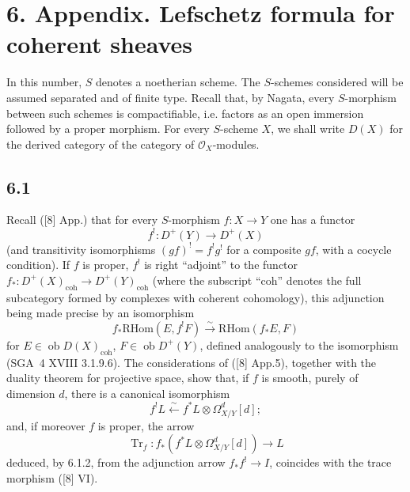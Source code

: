 \documentclass[11pt]{article}
\providecommand{\cO}{\mathcal{O}}
\providecommand{\RHom}{\mathrm{RHom}}
\begin{document}
\section*{6. Appendix. Lefschetz formula for coherent sheaves}

In this number, $S$ denotes a noetherian scheme. The $S$-schemes considered will be assumed separated and of finite type. Recall that, by Nagata, every $S$-morphism between such schemes is compactifiable, i.e. factors as an open immersion followed by a proper morphism. For every $S$-scheme $X$, we shall write $D(X)$ for the derived category of the category of $\cO_X$-modules.

\subsection*{6.1}
Recall ([8] App.) that for every $S$-morphism $f:X\to Y$ one has a functor
\[
f^!:D^+(Y)\longrightarrow D^+(X)
\]
(and transitivity isomorphisms $(gf)^! = f^!g^!$ for a composite $gf$, with a cocycle condition). If $f$ is proper, $f^!$ is right ``adjoint'' to the functor $f_*:D^+(X)_{\mathrm{coh}}\to D^+(Y)_{\mathrm{coh}}$ (where the subscript ``coh'' denotes the full subcategory formed by complexes with coherent cohomology), this adjunction being made precise by an isomorphism
\begin{equation}
\tag{6.1.1}
f_*\RHom(E,f^!F)\xrightarrow{\sim}\RHom(f_*E,F)
\end{equation}
for $E\in\operatorname{ob}D(X)_{\mathrm{coh}}$, $F\in\operatorname{ob}D^+(Y)$, defined analogously to the isomorphism (SGA~4 XVIII 3.1.9.6). The considerations of ([8] App.5), together with the duality theorem for projective space, show that, if $f$ is smooth, purely of dimension $d$, there is a canonical isomorphism
\begin{equation}
\tag{6.1.2}
f^!L\xleftarrow{\sim} f^*L\otimes\Omega^d_{X/Y}[d];
\end{equation}
and, if moreover $f$ is proper, the arrow
\begin{equation}
\tag{6.1.3}
\operatorname{Tr}_f:f_*(f^*L\otimes\Omega^d_{X/Y}[d])\longrightarrow L
\end{equation}
deduced, by 6.1.2, from the adjunction arrow $f_*f^!\to I$, coincides with the trace morphism ([8] VI).
\end{document}
